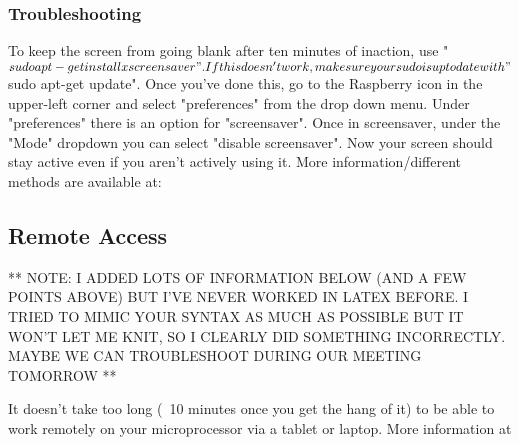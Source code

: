 \documentclass{article}\usepackage[]{graphicx}\usepackage[]{color}
\begin{document}
\subsubsection{Troubleshooting}


\Line To keep the screen from going blank after ten minutes of inaction, use "$sudo apt-get install xscreensaver".  If this doesn't work, make sure your sudo is up to date with "$sudo apt-get update".  
\Line Once you've done this, go to the Raspberry icon in the upper-left corner and select "preferences" from the drop down menu.  Under "preferences" there is an option for "screensaver".  
\Line Once in screensaver, under the "Mode" dropdown you can select "disable screensaver".  
\Line Now your screen should stay active even if you aren't actively using it.
\Line More information/different methods are available at: %

\subsection{Remote Access}

** NOTE: I ADDED LOTS OF INFORMATION BELOW (AND A FEW POINTS ABOVE) BUT I'VE NEVER WORKED IN LATEX BEFORE.  I TRIED TO MIMIC YOUR SYNTAX AS MUCH AS POSSIBLE BUT IT WON'T LET ME KNIT, SO I CLEARLY DID SOMETHING INCORRECTLY.  MAYBE WE CAN TROUBLESHOOT DURING OUR MEETING TOMORROW **

It doesn't take too long (~10 minutes once you get the hang of it) to be able to work remotely on your microprocessor via a tablet or laptop.  More information at %
\end{document}
